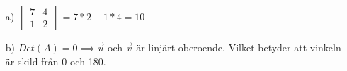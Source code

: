 \begin{itemize}
\item[a) ]$ 		\begin{vmatrix}
   		 		7  & 4 \\
  		  		1  & 2
		    	\end{vmatrix}
		    	=
		    	7*2 - 1*4
		    	= 10
  			  	$
\item[b) ] $Det(A) = 0 \implies \vec{u}$ och $\vec{v}$ är linjärt oberoende. Vilket betyder att vinkeln är skild från 0 och 180.
\end{itemize}
